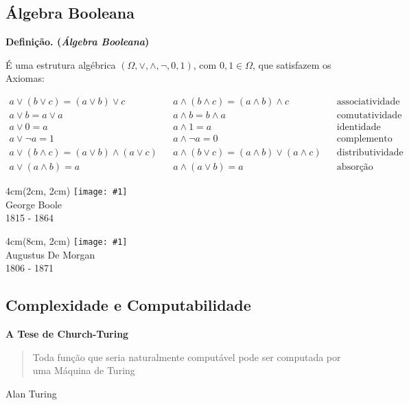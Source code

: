 \documentclass[t]{beamer}
\newcommand{\titulo}[1]{%
	\textbf{\Large #1\\}
}
\newcommand{\definicao}[1]{%
	\textbf{Definição. (\emph{#1})\\}
}
\newcommand{\frasepor}[2]{
	\begin{center}
		\begin{quote}
			#1
		\end{quote}
		\hfill {\small #2}
	\end{center}
}
\newcommand{\person}[6]{%
\begin{textblock*}{#4}(#5, #6)
	\texttt{[image: \#1]}\\
	#2\\
	{\small #3}
\end{textblock*}
}
\begin{document}
	\subsection{Álgebra Booleana}
	
	
	\begin{frame}{\subsecname}
	\definicao{Álgebra Booleana}
	É uma estrutura algébrica $(\Omega, \vee, \wedge, \neg, 0, 1)$, com $0,1 \in \Omega$, que satisfazem os Axiomas:
	
	\footnotesize
		\begin{align*}
			a \vee (b \vee c) = (a \vee b) \vee c && a \wedge (b \wedge c) = (a \wedge b) \wedge c && \text{associatividade}\\
			a \vee b = a \vee a && a \wedge b = b \wedge a && \text{comutatividade}\\
			a \vee 0 = a && a \wedge 1 = a && \text{identidade}\\
			a \vee \neg a = 1 && a \wedge \neg a = 0 && \text{complemento}\\
			a \vee (b \wedge c) = (a \vee b) \wedge (a \vee c) && a \wedge (b \vee c) = (a \wedge b) \vee (a \wedge c) && \text{distributividade}\\
			a \vee (a \wedge b) = a && a \wedge (a \vee b) = a && \text{absorção}
		\end{align*}
	\normalsize
	\end{frame}
	
	\begin{frame}{\subsecname}
		\person{boole.jpg}{George Boole}{1815 - 1864}{4cm}{2cm}{2cm}
		\person{de-morgan.jpg}{Augustus De Morgan}{1806 - 1871}{4cm}{8cm}{2cm}

	\end{frame}

	\subsection{Complexidade e Computabilidade}	
	
	\begin{frame}[label=turing]{\subsecname}
	\titulo{A Tese de Church-Turing}
	
	
	\frasepor{Toda função que seria naturalmente computável pode ser computada por uma Máquina de Turing}{Alan Turing}
	\end{frame}
	
\end{document}
